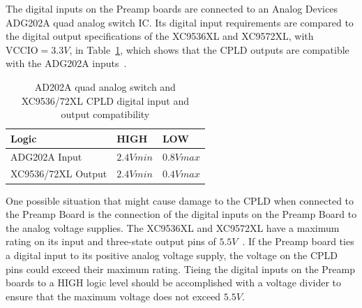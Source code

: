 The digital inputs on the Preamp boards are connected to an Analog Devices ADG202A quad analog switch IC.  Its digital input requirements are compared to the digital output specifications of the XC9536XL and XC9572XL, with $\mathrm{VCCIO}=3.3\unit{V}$, in Table~\ref{tab:PreampCPLDVolt}, which shows that the CPLD outputs are compatible with the ADG202A inputs~\cite{ADG202Ads,XC9536XLds,XC9572XLds}.

\renewcommand{\arraystretch}{1.3}
\begin{table}[h]
\centering 
\begin{tabular}{|l|l|l|}
\hline
Logic	& HIGH & LOW\\
\hline
ADG202A	Input & $2.4\unit{Vmin}$ & $0.8\unit{Vmax}$\\
\hline
XC9536/72XL	Output & $2.4\unit{Vmin}$ & $0.4\unit{Vmax}$\\
\hline
\end{tabular}
\caption{AD202A quad analog switch and XC9536/72XL CPLD digital input and output compatibility\label{tab:PreampCPLDVolt} }

\end{table}
\renewcommand{\arraystretch}{1.0}

One possible situation that might cause damage to the CPLD when connected to the Preamp Board is the connection of the digital inputs on the Preamp Board to the analog voltage supplies.  The XC9536XL and XC9572XL have a maximum rating on its input and three-state output pins of $5.5\unit{V}$~\cite{XC9536XLds,XC9572XLds}.  If the Preamp board ties a digital input to its positive analog voltage supply, the voltage on the CPLD pins could exceed their maximum rating.  Tieing the digital inputs on the Preamp boards to a HIGH logic level should be accomplished with a voltage divider to ensure that the maximum voltage does not exceed $5.5\unit{V}$.
